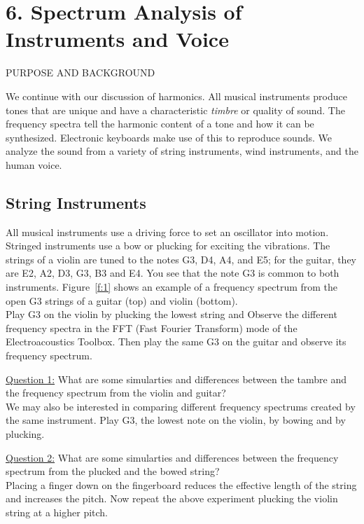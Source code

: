 \documentclass[11pt]{NSF}
\begin{document}
\section{6. Spectrum Analysis of Instruments and Voice}

PURPOSE AND BACKGROUND

We continue with our discussion of harmonics. 
All musical instruments produce tones that
are unique and have a characteristic {\em timbre} or quality of sound. The
frequency spectra tell the harmonic content of a tone and how it can
be synthesized. Electronic keyboards make use of this to reproduce
sounds. We analyze the sound from a variety of string instruments, 
wind instruments, and the human voice.

\subsection{String Instruments}

All musical instruments use a driving force to set an oscillator into
motion. Stringed instruments use a bow or plucking for exciting the
vibrations. 
The strings of a violin are tuned to the notes G3, D4, A4, and E5;
for the guitar, they are E2, A2, D3, G3, B3 and E4. You see that the
note G3 is common to both instruments. 
Figure~\ref{f:1} shows an example of a frequency spectrum from the 
open G3 strings of a guitar (top) and violin (bottom). \\

Play G3 on the violin by plucking the lowest string and Observe the different frequency
spectra in the FFT (Fast Fourier Transform) mode of the Electroacoustics Toolbox.
Then play the same G3 on the guitar and observe its frequency spectrum. 

\underline{Question 1:} What are some simularties and differences between the tambre and the frequency spectrum from the violin and guitar? \\

We may also be interested in comparing different frequency spectrums created by the same instrument.
Play G3, the lowest note on the violin, by bowing and by plucking. 

\underline{Question 2:} What are some simularties and differences between the frequency spectrum from the plucked and the bowed string? \\

Placing a finger down on the fingerboard reduces the effective length of the string and increases
the pitch. Now repeat the above experiment plucking the violin string at a higher pitch. \\
\end{document}
